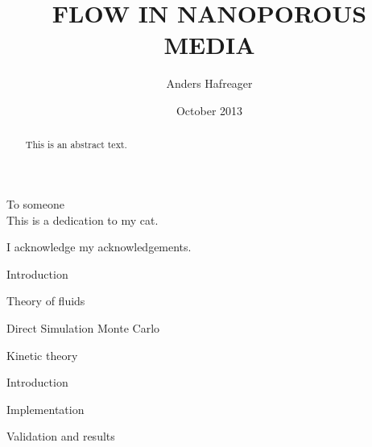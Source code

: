 \documentclass[twoside,english, a4paper, 12pt]{uiofysmaster}
\author{Anders Hafreager}
\title{\uppercase{Flow in nanoporous media}}
\date{October 2013}
\begin{document}
\maketitle
\clearpage

\begin{abstract}
This is an abstract text.
\end{abstract}
\begin{dedication}
  To someone
  \\\vspace{12pt}
  This is a dedication to my cat.
\end{dedication}
\begin{acknowledgements}
  I acknowledge my acknowledgements.
\end{acknowledgements}

\tableofcontents
\clearpage
\listoffigures
\clearpage
\listoftables

\begin{chapter}{Introduction}
  
\end{chapter}

\begin{chapter}{Theory of fluids}
  
  
  
\end{chapter}

\begin{part}{Direct Simulation Monte Carlo}
\begin{chapter}{Kinetic theory}
  
  
\end{chapter}

\begin{chapter}{Introduction}
  \label{chap:dsmc}
  
  
  
  
  
  
  
  
\end{chapter}
\begin{chapter}{Implementation}
  
  
  
  
\end{chapter}
\begin{chapter}{Validation and results}
  
  
\end{chapter}
\end{part}
\end{document}
